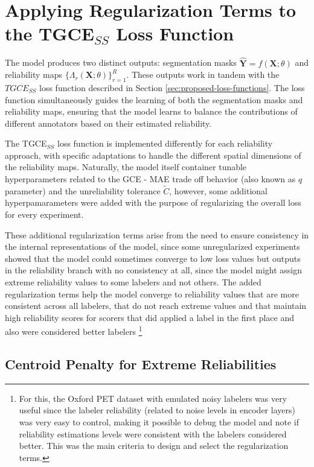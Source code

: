 \section{Applying Regularization Terms to the TGCE$_{SS}$ Loss
Function}\label{sec:regularizers}

The model produces two distinct outputs: segmentation masks
$\mathbf{\hat{Y}} = f(\mathbf{X};\theta)$ and reliability maps
$\{\Lambda_r(\mathbf{X};\theta)\}_{r=1}^R$. These outputs work in
tandem with the $TGCE_{SS}$ loss function described in Section
\ref{sec:proposed-loss-functions}. The loss function simultaneously guides the
learning of both the segmentation masks and reliability maps,
ensuring that the model learns to balance the contributions of
different annotators based on their estimated reliability.

The TGCE$_{SS}$ loss function is implemented differently for each reliability
approach, with specific adaptations to handle the different spatial dimensions
of the reliability maps. Naturally, the model itself container tunable
hyperparameters related to the \gls{GCE} - \gls{MAE} trade off behavior
(also known as $q$ parameter) and the unreliability tolerance $\tilde C$,
however, some additional hyperpamarameters were added with the purpose of
regularizing the overall loss for every experiment.

These additional regularization terms arise from the need to ensure
consistency in the internal representations of the model, since some
unregularized experiments showed that the model could sometimes converge to
low loss values but outputs in the reliability branch with no
consistency at all, since the model might assign extreme reliability
values to some labelers and not others. The added regularization terms help the
model converge to reliability values that are more consistent across
all labelers, that do not reach extreme values and that maintain high
reliability scores for scorers that did applied a label in the first
place and also were considered better labelers \footnote{For this,
  the Oxford PET dataset with emulated noisy labelers was very
  useful since the labeler reliability (related to noise levels in encoder
  layers) was very easy to control, making it possible
  to debug the model and note if reliability estimations levels were consistent
  with the labelers considered better. This was the main criteria to
design and select the regularization terms.}

\subsection{Centroid Penalty for Extreme Reliabilities}

